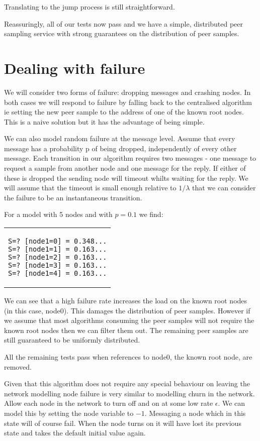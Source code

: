 \documentclass[a4paper,10pt]{article}
\newcommand{\prismmodel}[1]{
  \begin{quotation}
  \footnotesize
  
  \end{quotation}
}
\newenvironment{prismprop}[0]{
  \begin{center}
  \begin{tabular}{c}
  \footnotesize
}{
  \end{tabular}
  \end{center}
}
\begin{document}
Translating to the jump process is still straightforward.

\prismmodel{dtmc_full}

Reassuringly, all of our tests now pass and we have a simple, distributed peer sampling service with strong guarantees on the distribution of peer samples.

\section{Dealing with failure}

We will consider two forms of failure: dropping messages and crashing nodes. In both cases we will respond to failure by falling back to the centralised algorithm ie setting the new peer sample to the address of one of the known root nodes. This is a naive solution but it has the advantage of being simple. 

We can also model random failure at the message level. Assume that every message has a probability p of being dropped, independently of every other message. Each transition in our algorithm requires two messages - one message to request a sample from another node and one message for the reply. If either of these is dropped the sending node will timeout whilts waiting for the reply. We will assume that the timeout is small enough relative to $1/\lambda$ that we can consider the failure to be an instantaneous transition.

\prismmodel{ctmc_full_error}

For a model with 5 nodes and with $p=0.1$ we find:

\begin{prismprop}
\begin{lstlisting}
S=? [node1=0] = 0.348...
S=? [node1=1] = 0.163...
S=? [node1=2] = 0.163...
S=? [node1=3] = 0.163...
S=? [node1=4] = 0.163...
\end{lstlisting}
\end{prismprop}

We can see that a high failure rate increases the load on the known root nodes (in this case, node0). This damages the distribution of peer samples. However if we assume that most algorithms consuming the peer samples will not require the known root nodes then we can filter them out. The remaining peer samples are still guaranteed to be uniformly distributed.

All the remaining tests pass when references to node0, the known root node, are removed.

Given that this algorithm does not require any special behaviour on leaving the network modelling node failure is very similar to modelling churn in the network. Allow each node in the network to turn off and on at some low rate $\epsilon$. We can model this by setting the node variable to $-1$. Messaging a node which in this state will of course fail. When the node turns on it will have lost its previous state and takes the default initial value again.
\end{document}
